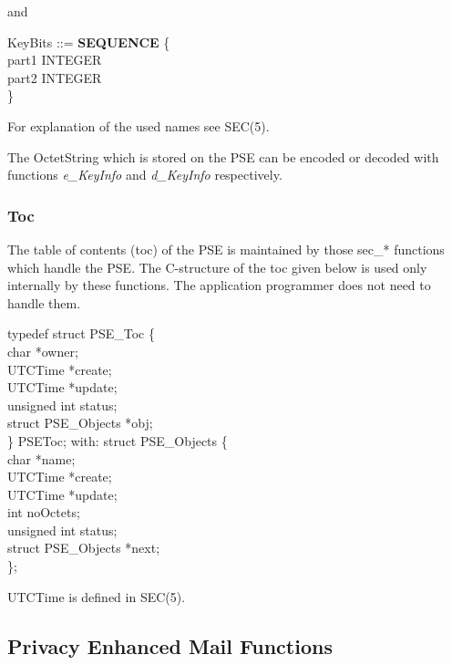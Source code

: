 and

{\small
\bvtab
\1 KeyBits ::= \3 {\bf SEQUENCE} \{ \\
\5                 part1 \2  INTEGER    \\
\5                 part2 \2  INTEGER \\
\4 \}
\evtab
}


For explanation of the used names see SEC(5). 

The OctetString which is stored on the PSE can be encoded or decoded with functions
{\em e\_KeyInfo} and {\em d\_KeyInfo} respectively.

\subsubsection{Toc}
The table of contents (toc) of the PSE is maintained by those sec\_* functions which 
handle the PSE. The C-structure of the toc given below is used only internally by these
functions. The application programmer does not need to handle them.

{\small
\bvtab
\4      typedef struct PSE\_Toc \{ \\
\6              char                \4 *owner; \\
\6              UTCTime             \4 *create; \\
\6              UTCTime             \4 *update; \\
\6		unsigned int        \4  status; \\
\6              struct PSE\_Objects \4 *obj; \\
\4      \} PSEToc;
\evtab
}
with:
{\small
\bvtab
\4      struct PSE\_Objects \{ \\
\6              char                \4 *name; \\
\6              UTCTime             \4 *create; \\
\6              UTCTime             \4 *update; \\
\6	        int                 \4  noOctets; \\
\6	        unsigned int        \4  status; \\
\6              struct PSE\_Objects \4 *next; \\
\4      \};
\evtab
}

UTCTime is defined in SEC(5).
\subsection{Privacy Enhanced Mail Functions} 

